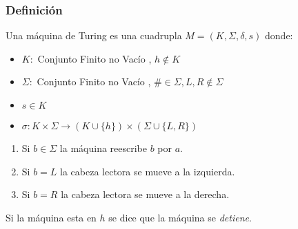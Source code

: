 \subsubsection*{Definición}
Una máquina de Turing es una cuadrupla $M=(K,\Sigma,\delta,s)$ donde:
\begin{itemize}
\item $K:$ Conjunto Finito no Vacío , $h\notin K$
\item $\Sigma:$ Conjunto Finito no Vacío , $\#\in\Sigma , L,R\notin\Sigma$
\item $s\in K$
\item $\sigma: K\times\Sigma \rightarrow (K\cup\{h\}) \times (\Sigma\cup\{L,R\})$
\end{itemize}

\begin{enumerate}
\item {\color{red} Si $b\in\Sigma$ } la máquina reescribe $b$ por $a$.
\item {\color{red} Si $b=L$ } la cabeza lectora se mueve a la izquierda.
\item {\color{red} Si $b=R$ } la cabeza lectora se mueve a la derecha.
\end{enumerate}
\begin{center}
{\color{red}  Si la máquina esta en $h$} se dice que la máquina se \textit{detiene}.
\end{center}
